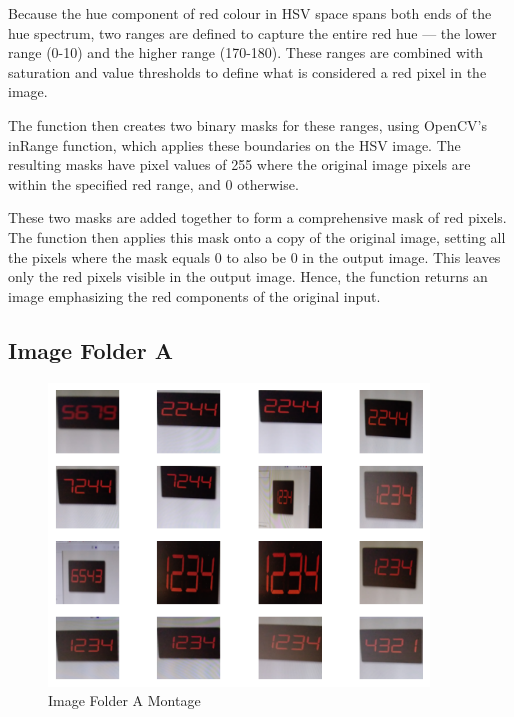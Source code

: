Because the hue component of red colour in HSV space spans both ends of the hue spectrum, two ranges are defined to capture the entire red hue — the lower range (0-10) and the higher range (170-180). These ranges are combined with saturation and value thresholds to define what is considered a red pixel in the image.

The function then creates two binary masks for these ranges, using OpenCV's inRange function, which applies these boundaries on the HSV image. The resulting masks have pixel values of 255 where the original image pixels are within the specified red range, and 0 otherwise.

These two masks are added together to form a comprehensive mask of red pixels. The function then applies this mask onto a copy of the original image, setting all the pixels where the mask equals 0 to also be 0 in the output image. This leaves only the red pixels visible in the output image. Hence, the function returns an image emphasizing the red components of the original input.


\newpage

\subsection{Image Folder A}

\begin{figure}[ht]
    \centering
    \includegraphics[width=0.9\textwidth]{Figures/EDA_Charts/2/montage.png}
    \caption[Image Folder A Montage]{Image Folder A Montage}
    \label{fig:Image Folder A Montage}
\end{figure}

